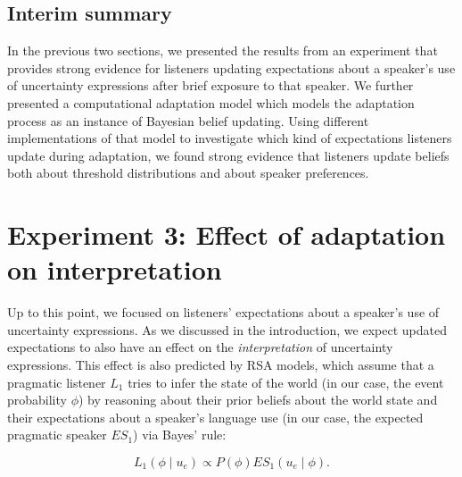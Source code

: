\subsection{Interim summary}

In the previous two sections, we presented the results from an experiment that provides strong evidence for
listeners updating expectations about a speaker's use of uncertainty expressions after brief
exposure to that speaker. We further presented a computational adaptation model which models the adaptation
process as an instance of Bayesian belief updating. Using different implementations
of that model to investigate which kind of expectations listeners update during adaptation, we found strong evidence that listeners update beliefs both about  threshold distributions and 
 about speaker preferences.

\section{Experiment 3: Effect of adaptation on interpretation}
\label{sec:exp-model-interpretation}


Up to this point, we focused on listeners' expectations about a speaker's use of uncertainty expressions. As we discussed
in the introduction, we expect updated expectations to also have an effect on the \emph{interpretation} of uncertainty expressions. This
effect is also predicted by RSA models,  which assume that a pragmatic listener $L_1$ tries to infer the state of the world (in our case, the event probability $\phi$) by reasoning
about their prior beliefs about the world state and their expectations about a speaker's language use (in our case, the expected pragmatic speaker $ES_{1}$) via Bayes' rule:

$$ L_1(\phi \mid u_e) \propto P(\phi) ES_1(u_e \mid \phi).$$

